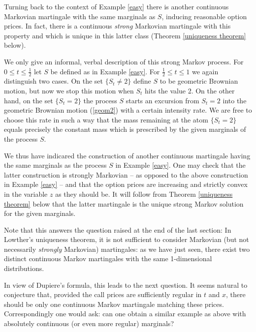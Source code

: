 \documentclass[11pt,a4paper]{article}%
\numberwithin{equation}{section}
\begin{document}
\vspace{1em}

Turning back to the context of Example \ref{easy} there is another continuous Markovian martingale with the same marginals as $S$, inducing reasonable option prices. In fact, there is a continuous \textit{strong} Markovian martingale with this property and which is unique in this latter class (Theorem \ref{uniqueness theorem} below).

We only give an informal, verbal description of this strong Markov process. For $0 \le t \le \frac{1}{2}$ let $S$ be defined as in Example \ref{easy}. For $\frac{1}{2} \le t \le 1$ we again distinguish two cases. On the set $\{S_t \neq 2\} $ define $S$ to be geometric Brownian motion, but now we stop this motion when $S_t$ hits the value 2. On the other hand, on the set $\{S_t = 2\} $ the process $S$ starts an excursion from $S_t=2$ into the geometric Brownian motion (\ref{geom2}) with a certain intensity rate. We are free to choose this rate in such a way that the mass remaining at the atom $\{S_t=2\}$ equals precisely the constant mass which is prescribed by the given marginals of the process $S$.

We thus have indicared the construction of another continuous martingale having the same marginals as the process $S$ in Example \ref{easy}. One may check that the latter construction is strongly Markovian -- as opposed to the above construction in Example \ref{easy} -- and that the option prices are increasing and strictly convex in the variable $z$ as they should be. It will follow from Theorem \ref{uniqueness theorem} below that the latter martingale is the unique strong Markov solution for the given marginals.



Note that this answers the question raised at the end of the last section: In Lowther's uniqueness theorem, it is not sufficient to consider Markovian (but not necessarily \emph{strongly} Markovian) martingales: as we have just seen, there exist two distinct continuous Markov martingales with the same 1-dimensional distributions. 

 In view of Dupiere's formula, this leads to the next question. It seems natural to conjecture that, provided the call prices are sufficiently regular in $t$ and $x$, there should be only one continuous Markov martingale matching these prices. Correspondingly one would ask:  can one obtain a similar example as above  with absolutely continuous (or even more regular) marginals?
\end{document}
